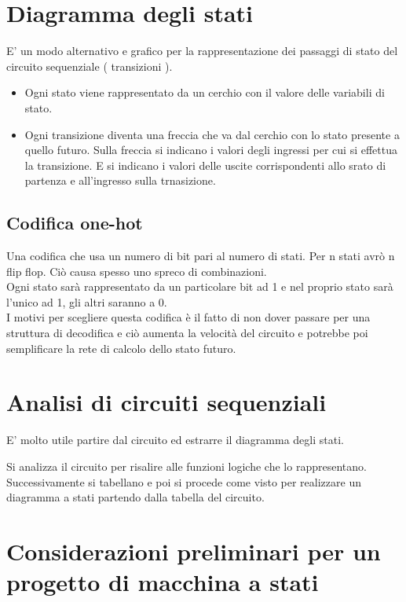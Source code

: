 \documentclass[a4paper]{book}
\begin{document}


\section{Diagramma degli stati}

E' un modo alternativo e grafico per la rappresentazione dei passaggi di stato del circuito sequenziale ( transizioni ).

\begin{itemize}
\item{}Ogni stato viene rappresentato da un cerchio con il valore delle variabili di stato.\\
\item{}Ogni transizione diventa una freccia che va dal cerchio con lo stato presente a quello futuro.
Sulla freccia si indicano i valori degli ingressi per cui si effettua la transizione.
E si indicano i valori delle uscite corrispondenti allo srato di partenza e all'ingresso sulla trnasizione.
\end{itemize}


\subsection*{Codifica one-hot}

Una codifica che usa un numero di bit pari al numero di stati.
Per n stati avrò n flip flop.
Ciò causa spesso uno spreco di combinazioni.\\
Ogni stato sarà rappresentato da un particolare bit ad 1 e nel proprio stato sarà l'unico ad 1, gli altri saranno a 0.\\
I motivi per scegliere questa codifica è il fatto di non dover passare per una struttura di decodifica e ciò aumenta la velocità del circuito e potrebbe poi semplificare la rete di calcolo dello stato futuro.


\section{Analisi di circuiti sequenziali}

E' molto utile partire dal circuito ed estrarre il diagramma degli stati.

Si analizza il circuito per risalire alle funzioni logiche che lo rappresentano.
Successivamente si tabellano e poi si procede come visto per realizzare un diagramma a stati partendo dalla tabella del circuito.

\section{Considerazioni preliminari per un progetto di macchina a stati}
\end{document}
